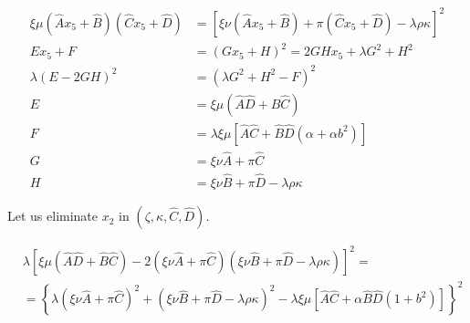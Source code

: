 \documentclass[12pt]{article}
\numberwithin{table}{section}
\begin{document}
\begin{align}
\xi \mu (\hat A x_5 + \hat B)(\hat C x_5 + \hat D)  &= \left[ \xi\nu (\hat A x_5 + \hat B)  + \pi (\hat C x_5 + \hat D) - \lambda \rho \kappa \right]^2 \\
E x_5 + F  &= ( G x_5 + H )^2 = 2GH x_5 + \lambda G^2 + H^2 \\
\lambda (E - 2GH)^2  &= \left(\lambda G^2 + H^2 - F\right)^2 \\
E &= \xi \mu(\hat A\hat D + \hat B\hat C)\\
F &= \lambda \xi \mu [\hat A\hat C + \hat B\hat D(\alpha + \alpha b^2)] \\
G &= \xi \nu \hat A + \pi \hat C \\
H &= \xi \nu \hat B + \pi \hat D - \lambda \rho \kappa
\end{align}

Let us eliminate $x_2$ in $(\zeta,\kappa, \hat C, \hat D)$.

\footnotesize

\begin{align}
&\lambda \left[\xi \mu(\hat A\hat D + \hat B\hat C) - 2\left(\xi \nu \hat A + \pi \hat C\right) \left(\xi \nu \hat B + \pi \hat D - \lambda \rho \kappa\right) \right]^2 = \nonumber\\
&= \left\{\lambda \left(\xi \nu \hat A + \pi \hat C\right)^2 + \left(\xi \nu \hat B   + \pi \hat D - \lambda \rho \kappa\right) ^2 - \lambda \xi \mu [\hat A\hat C + \alpha\hat B\hat D(1 + b^2)]\right\}^2 
\end{align}

\normalsize
\end{document}
